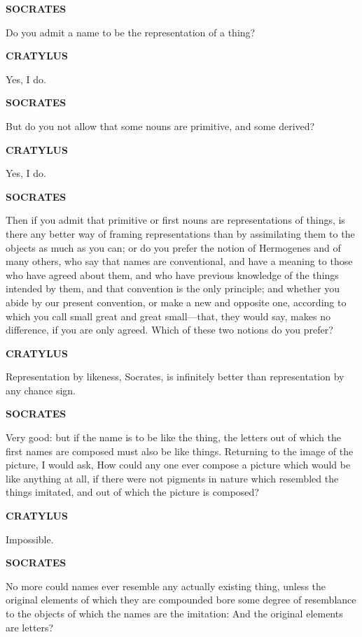 \documentclass[11pt,letter]{article}
\begin{document}
\par \textbf{SOCRATES}
\par   Do you admit a name to be the representation of a thing?

\par \textbf{CRATYLUS}
\par   Yes, I do.

\par \textbf{SOCRATES}
\par   But do you not allow that some nouns are primitive, and some derived?

\par \textbf{CRATYLUS}
\par   Yes, I do.

\par \textbf{SOCRATES}
\par   Then if you admit that primitive or first nouns are representations of things, is there any better way of framing representations than by assimilating them to the objects as much as you can; or do you prefer the notion of Hermogenes and of many others, who say that names are conventional, and have a meaning to those who have agreed about them, and who have previous knowledge of the things intended by them, and that convention is the only principle; and whether you abide by our present convention, or make a new and opposite one, according to which you call small great and great small—that, they would say, makes no difference, if you are only agreed. Which of these two notions do you prefer?

\par \textbf{CRATYLUS}
\par   Representation by likeness, Socrates, is infinitely better than representation by any chance sign.

\par \textbf{SOCRATES}
\par   Very good:  but if the name is to be like the thing, the letters out of which the first names are composed must also be like things. Returning to the image of the picture, I would ask, How could any one ever compose a picture which would be like anything at all, if there were not pigments in nature which resembled the things imitated, and out of which the picture is composed?

\par \textbf{CRATYLUS}
\par   Impossible.

\par \textbf{SOCRATES}
\par   No more could names ever resemble any actually existing thing, unless the original elements of which they are compounded bore some degree of resemblance to the objects of which the names are the imitation:  And the original elements are letters?
\end{document}
